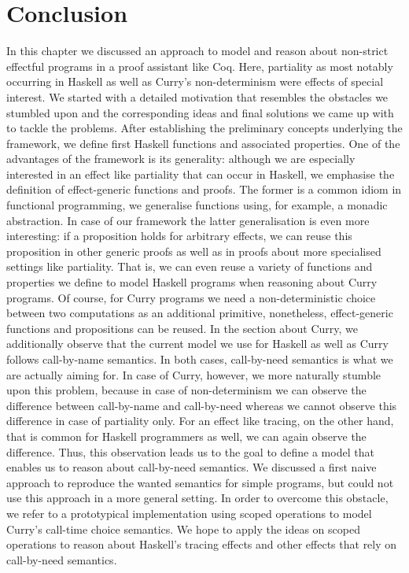\section{Conclusion}
\label{sec:conclusion}

In this chapter we discussed an approach to model and reason about non\--strict effectful programs in a proof assistant like Coq.
Here, partiality as most notably occurring in Haskell as well as Curry's non\--determinism were effects of special interest.
We started with a detailed motivation that resembles the obstacles we stumbled upon and the corresponding ideas and final solutions we came up with to tackle the problems.
After establishing the preliminary concepts underlying the framework, we define first Haskell functions and associated properties.
One of the advantages of the framework is its generality: although we are especially interested in an effect like partiality that can occur in Haskell, we emphasise the definition of effect\--generic functions and proofs.
The former is a common idiom in functional programming, we generalise functions using, for example, a monadic abstraction.
In case of our framework the latter generalisation is even more interesting: if a proposition holds for arbitrary effects, we can reuse this proposition in other generic proofs as well as in proofs about more specialised settings like partiality.
That is, we can even reuse a variety of functions and properties we define to model Haskell programs when reasoning about Curry programs.
Of course, for Curry programs we need a non\--deterministic choice between two computations as an additional primitive, nonetheless, effect\--generic functions and propositions can be reused.
In the section about Curry, we additionally observe that the current model we use for Haskell as well as Curry follows call\--by\--name semantics.
In both cases, call\--by\--need semantics is what we are actually aiming for.
In case of Curry, however, we more naturally stumble upon this problem, because in case of non\--determinism we can observe the difference between call\--by\--name and call\--by\--need whereas we cannot observe this difference in case of partiality only.
For an effect like tracing, on the other hand, that is common for Haskell programmers as well, we can again observe the difference.
Thus, this observation leads us to the goal to define a model that enables us to reason about call\--by\--need semantics.
We discussed a first naive approach to reproduce the wanted semantics for simple programs, but could not use this approach in a more general setting.
In order to overcome this obstacle, we refer to a prototypical implementation using scoped operations to model Curry's call\--time choice semantics.
We hope to apply the ideas on scoped operations to reason about Haskell's tracing effects and other effects that rely on call\--by\--need semantics.


